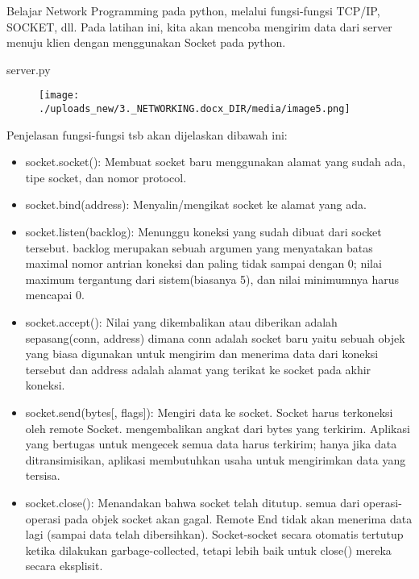 \documentclass[a4paper,12pt]{report}
\begin{document}
Belajar Network Programming pada python, melalui fungsi-fungsi TCP/IP, SOCKET, dll. Pada latihan ini, kita akan mencoba mengirim data dari server menuju klien dengan menggunakan Socket pada python. \par
\noindent 
\begin{myEnumerate}
\item server.py\end{myEnumerate}
 \par
\noindent 
\begin{center}



\begin{figure}[H]
\begin{center}
\texttt{[image: ./uploads\_new/3.\_NETWORKING.docx\_DIR/media/image5.png]}
\end{center}
\end{figure}




\end{center}\vspace{12pt}
\noindent 
Penjelasan fungsi-fungsi tsb akan dijelaskan dibawah ini: \par
\noindent 
\begin{itemize}
\item socket.socket(): Membuat socket baru menggunakan alamat yang sudah ada, tipe socket, dan nomor protocol. \par
\noindent 
\item socket.bind(address): Menyalin/mengikat socket ke alamat yang ada. \par
\noindent 
\item socket.listen(backlog): Menunggu koneksi yang sudah dibuat dari socket tersebut. backlog merupakan sebuah argumen yang menyatakan batas maximal nomor antrian koneksi dan paling tidak sampai dengan 0; nilai maximum tergantung dari sistem(biasanya 5), dan nilai minimumnya harus mencapai 0. \par
\noindent 
\item socket.accept(): Nilai yang dikembalikan atau diberikan adalah sepasang(conn, address) dimana conn adalah socket baru yaitu sebuah objek yang biasa digunakan untuk mengirim dan menerima data dari koneksi tersebut dan address adalah alamat yang terikat ke socket pada akhir koneksi. \par
\noindent 
\item socket.send(bytes[, flags]): Mengiri data ke socket. Socket harus terkoneksi oleh remote Socket. mengembalikan angkat dari bytes yang terkirim. Aplikasi yang bertugas untuk mengecek semua data harus terkirim; hanya jika data ditransimisikan, aplikasi membutuhkan usaha untuk mengirimkan data yang tersisa. \par
\noindent 
\item socket.close(): Menandakan bahwa socket telah ditutup. semua dari operasi-operasi pada objek socket akan gagal. Remote End tidak akan menerima data lagi (sampai data telah dibersihkan). Socket-socket secara otomatis tertutup ketika dilakukan garbage-collected, tetapi lebih baik untuk close() mereka secara eksplisit.\end{itemize}
\end{document}

